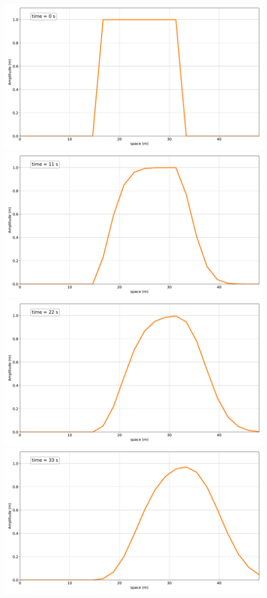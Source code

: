   \includegraphics[width=\linewidth]{../BurgersEquation/images/Linear_Convection0.pdf}
  \includegraphics[width=\linewidth]{../BurgersEquation/images/Linear_Convection1.pdf}
  \includegraphics[width=\linewidth]{../BurgersEquation/images/Linear_Convection2.pdf}
  \includegraphics[width=\linewidth]{../BurgersEquation/images/Linear_Convection3.pdf}
